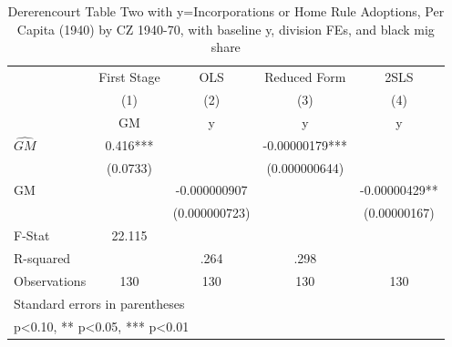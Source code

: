 \begin{table}[htbp]\centering
\def\sym#1{\ifmmode^{#1}\else\(^{#1}\)\fi}
\caption{Dererencourt Table Two with y=Incorporations or Home Rule Adoptions, Per Capita (1940) by CZ 1940-70, with baseline y, division FEs, and black mig share}
\begin{tabular}{l*{4}{c}}
\toprule
                    & First Stage   &         OLS   &Reduced Form   &        2SLS   \\
                    &\multicolumn{1}{c}{(1)}&\multicolumn{1}{c}{(2)}&\multicolumn{1}{c}{(3)}&\multicolumn{1}{c}{(4)}\\
                    &\multicolumn{1}{c}{GM}&\multicolumn{1}{c}{y}&\multicolumn{1}{c}{y}&\multicolumn{1}{c}{y}\\
\midrule
$\hat{GM}$          &       0.416***&               & -0.00000179***&               \\
                    &    (0.0733)   &               &(0.000000644)   &               \\
\addlinespace
GM                  &               &-0.000000907   &               & -0.00000429** \\
                    &               &(0.000000723)   &               &(0.00000167)   \\
\midrule
F-Stat              &      22.115   &               &               &               \\
R-squared           &               &        .264   &        .298   &               \\
Observations        &         130   &         130   &         130   &         130   \\
\bottomrule
\multicolumn{5}{l}{\footnotesize Standard errors in parentheses}\\
\multicolumn{5}{l}{\footnotesize * p<0.10, ** p<0.05, *** p<0.01}\\
\end{tabular}
\end{table}
